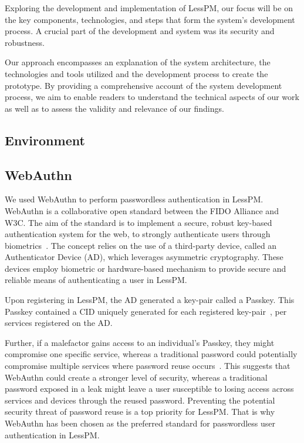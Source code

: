 
Exploring the development and implementation of LessPM, our focus will be on the
key components, technologies, and steps that form the system's development
process.
A crucial part of the development and system was its security and robustness.

Our approach encompasses an explanation of the system architecture, the
technologies and tools utilized and the development process to create the
prototype.
By providing a comprehensive account of the system development process, we aim
to enable readers to understand the technical aspects of our work as well
as to assess the validity and relevance of our findings.

\subsection{Environment}\label{subsec:environment}


\subsection{WebAuthn}\label{subsec:webauthn-methodology}
We used WebAuthn to perform passwordless authentication in LessPM\@.
WebAuthn is a collaborative open standard between the FIDO Alliance and W3C\@.
The aim of the standard is to implement a secure, robust key-based
authentication system for the web, to strongly authenticate users through
biometrics~\cite{webauthn_level_2}.
The concept relies on the use of a third-party device, called an
Authenticator Device (AD), which leverages asymmetric cryptography.
These devices employ biometric or hardware-based mechanism to provide secure
and reliable means of authenticating a user in LessPM\@.

Upon registering in LessPM, the AD generated a key-pair called a Passkey.
This Passkey contained a CID uniquely generated for each registered
key-pair~\cite{webauthn_credential_id,webauthn_public_key_credential}, per
services registered on the AD\@.

Further, if a malefactor gains access to an individual's Passkey, they might
compromise one specific service, whereas a traditional password could
potentially compromise multiple services where password reuse
occurs~\cite{wang2018next}.
This suggests that WebAuthn could create a stronger level of security, whereas
a traditional password exposed in a leak might leave a user susceptible to
losing access across services and devices through the reused password.
Preventing the potential security threat of password reuse is a top priority
for LessPM\@.
That is why WebAuthn has been chosen as the preferred standard for
passwordless user authentication in LessPM\@.

